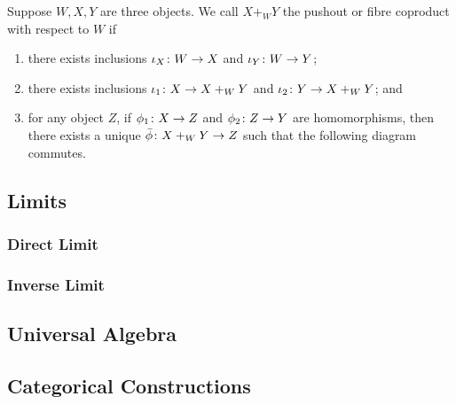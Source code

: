 \begin{definition}
    Suppose \(W,X,Y\) are three objects.
    We call \(X +_W Y\) the pushout or fibre coproduct with respect to \(W\) if
    \begin{enumerate}[label={(\roman*)}, itemsep=0mm]
        \item there exists inclusions \(\iota_X\colon W\to X\) and \(\iota_Y\colon W\to Y\);
        \item there exists inclusions \(\iota_1\colon X\to X +_W Y\)
            and \(\iota_2\colon Y\to X +_W Y\); and
        \item for any object \(Z\),
            if \(\phi_1\colon X\to Z\) and \(\phi_2\colon Z\to Y\) are homomorphisms,
            then there exists a unique \(\bar{\phi}\colon X +_W Y\to Z\)
            such that the following diagram commutes.
    \end{enumerate}
    \begin{center}
    \end{center}
\end{definition}


\subsection{Limits}

\subsubsection*{Direct Limit}

\subsubsection*{Inverse Limit}


\subsection{Universal Algebra}


\subsection{Categorical Constructions}
